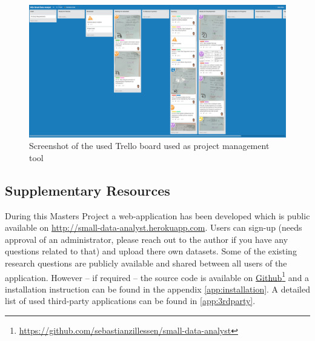 \begin{figure}[h]
\centering
	\includegraphics[page=1,width=\textwidth]{figures/trello}
\caption{Screenshot of the used Trello board used as project management tool}
\label{fig:trello}
\end{figure}

\subsection{Supplementary Resources}

During this Masters Project a web-application has been developed which is public available on \href{http://small-data-analyst.herokuapp.com}{http://small-data-analyst.herokuapp.com}. Users can sign-up (needs approval of an administrator, please reach out to the author if you have any questions related to that) and upload there own datasets. Some of the existing research questions are publicly available and shared between all users of the application. However -- if required -- the source code is available on \href{https://github.com/sebastianzillessen/small-data-analyst}{Github}\footnote{\href{https://github.com/sebastianzillessen/small-data-analyst}{https://github.com/sebastianzillessen/small-data-analyst}} and a installation instruction can be found in the appendix \autoref{app:installation}. A detailed list of used third-party applications can be found in \autoref{app:3rdparty}.

